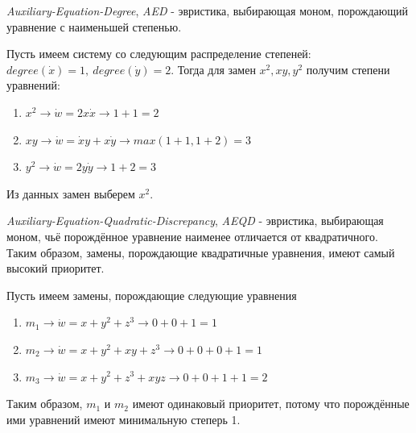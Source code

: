 \begin{heuristics} \label{heur:AED}
    \textit{Auxiliary-Equation-Degree}, \textit{AED} - эвристика, выбирающая моном, порождающий уравнение с наименьшей степенью. 
    
    \begin{example}
        Пусть имеем систему со следующим распределение степеней: $degree(\dot x) = 1,\ degree(\dot y) = 2$. Тогда для замен $x^2, xy, y^2$ получим степени уравнений:
        \begin{enumerate}
            \item $x^2 \longrightarrow \dot w = 2x \dot x \longrightarrow 1 + 1 = 2$
            \item $xy \longrightarrow \dot w = \dot x y + x \dot y \longrightarrow max(1 + 1, 1 + 2) = 3$
            \item $y^2 \longrightarrow \dot w = 2y \dot y \longrightarrow 1 + 2 = 3$
        \end{enumerate}
        Из данных замен выберем $x^2$.
    \end{example}
\end{heuristics}

\begin{heuristics} \label{heur:AEQD}
    \textit{Auxiliary-Equation-Quadratic-Discrepancy}, \textit{AEQD} - эвристика, выбирающая моном, чьё порождённое уравнение наименее отличается от квадратичного. Таким образом, замены, порождающие квадратичные уравнения, имеют самый высокий приоритет. 
    
    \begin{example}
        Пусть имеем замены, порождающие следующие уравнения
        \begin{enumerate}
            \item $m_1 \longrightarrow \dot w = x + y^2 + z^3 \longrightarrow 0 + 0 + 1 = 1$
            \item $m_2 \longrightarrow \dot w = x + y^2 + xy + z^3 \longrightarrow 0 + 0 + 0 + 1 = 1$
            \item $m_3 \longrightarrow \dot w = x + y^2 + z^3 + xyz \longrightarrow 0 + 0 +1 + 1 = 2$
        \end{enumerate}
        Таким образом, $m_1$ и $m_2$ имеют одинаковый приоритет, потому что порождённые ими уравнений имеют минимальную степерь 1.
    \end{example}
\end{heuristics}

